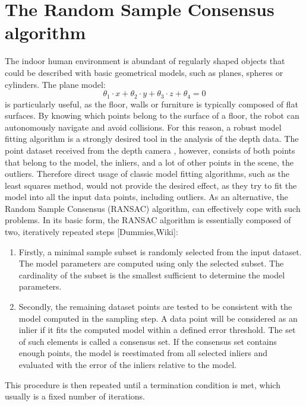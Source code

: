 
\section{The Random Sample Consensus algorithm}
\label{sec:ransac}
The indoor human environment is abundant of regularly shaped objects that could be described with basic geometrical models, such as planes, spheres or cylinders. The plane model:
\begin{equation}
\theta_1 \cdot x+\theta_2 \cdot y+\theta_3 \cdot z+\theta_4 = 0
\end{equation}
is particularly useful, as the floor, walls or furniture is typically composed of flat surfaces. By knowing which points belong to the surface of a floor, the robot can autonomously navigate and avoid collisions. For this reason, a robust model fitting algorithm is a strongly desired tool in the analysis of the depth data. The point dataset received from the depth camera , however, consists of both points that belong to the model, the inliers, and a lot of other points in the scene, the outliers. Therefore direct usage of classic model fitting algorithms, such as the least squares method, would not provide the desired effect, as they try to fit the model into all the input data points, including outliers. As an alternative, the Random Sample Consensus (RANSAC) algorithm, can effectively cope with such problems. In its basic form, the RANSAC algorithm is essentially composed of two, iteratively repeated steps [Dummies,Wiki]:
\begin{enumerate}
\item Firstly, a minimal sample subset is randomly selected from the input dataset. The model parameters are computed using only the selected subset. The cardinality of the subset is the smallest sufficient to determine the model parameters.
\item Secondly, the remaining dataset points are tested to be consistent with the model computed in the sampling step. A data point will be considered as an inlier if it fits the computed model within a defined error threshold. The set of such elements is called a consensus set. If the consensus set contains enough points, the model is reestimated from all selected inliers and evaluated with the error of the inliers relative to the model.
\end{enumerate}
This procedure is then repeated until a termination condition is met, which usually is a fixed number of iterations.
